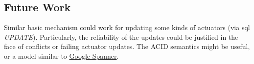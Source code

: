\documentclass[conference,10pt]{IEEEtran}
\begin{document}
\subsection{Future Work}\label{sec:future-work}

Similar basic mechanism could work for updating some kinds of actuators (via \gls{sql} \textit{UPDATE}). Particularly, the reliability of the updates could be justified in the face of conflicts or failing actuator updates. The ACID semantics might be useful, or a model similar to \href{https://dl.acm.org/doi/pdf/10.1145/2491245}{Google Spanner}.




\end{document}
